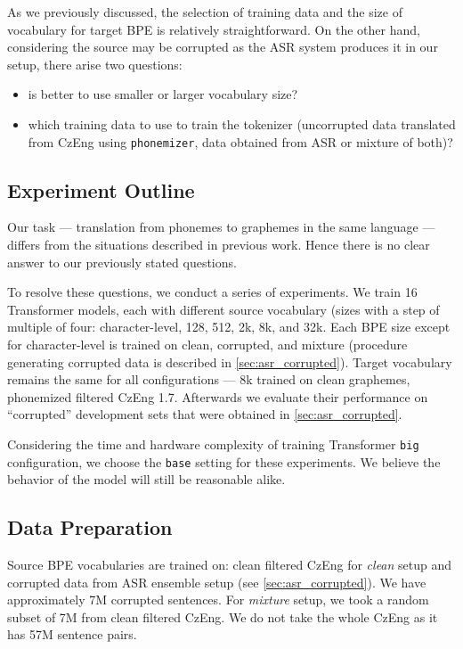 As we previously discussed, the selection of training data and the size of vocabulary for target BPE is relatively straightforward. On the other hand, considering the source may be corrupted as the ASR system produces it in our setup, there arise two questions: 

\begin{itemize}
	\item is better to use smaller or larger vocabulary size?
	\item which training data to use to train the tokenizer (uncorrupted data translated from CzEng using \texttt{phonemizer}, data obtained from ASR or mixture of both)?
\end{itemize}



\subsection{Experiment Outline}
Our task --- translation from phonemes to graphemes in the same language --- differs from the situations described in previous work. Hence there is no clear answer to our previously stated questions.

To resolve these questions, we conduct a series of experiments. We train 16 Transformer models, each with different source vocabulary (sizes with a step of multiple of four: character-level, 128, 512, 2k, 8k, and 32k. Each BPE size except for character-level is trained on clean, corrupted, and mixture (procedure generating corrupted data is described in \cref{sec:asr_corrupted}). Target vocabulary remains the same for all configurations --- 8k trained on clean graphemes, phonemized filtered CzEng 1.7. Afterwards we evaluate their performance on ``corrupted'' development sets that were obtained in \cref{sec:asr_corrupted}.

Considering the time and hardware complexity of training Transformer \texttt{big} configuration, we choose the \texttt{base} setting for these experiments. We believe the behavior of the model will still be reasonable alike.

\subsection{Data Preparation}
Source BPE vocabularies are trained on: clean filtered CzEng for \textit{clean} setup and corrupted data from ASR ensemble setup (see \cref{sec:asr_corrupted}). We have approximately 7M corrupted sentences. For \textit{mixture} setup, we took a random subset of 7M from clean filtered CzEng. We do not take the whole CzEng as it has 57M sentence pairs. 

